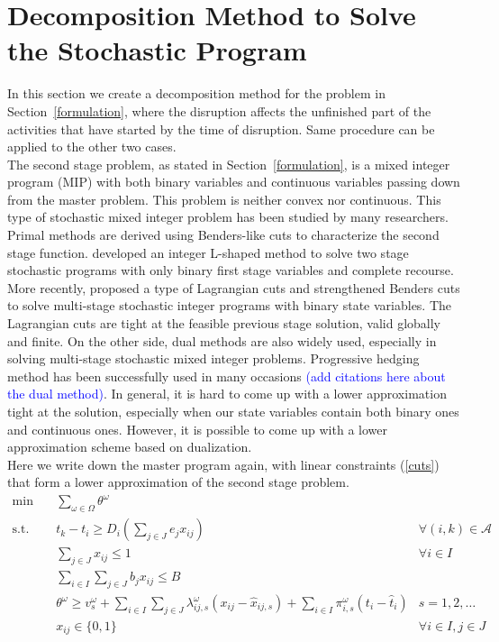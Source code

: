 \documentclass[11pt]{article}
\begin{document}
\section{Decomposition Method to Solve the Stochastic Program}
In this section we create a decomposition method for the problem in Section~\ref{formulation}, where the disruption affects the unfinished part of the activities that have started by the time of disruption. Same procedure can be applied to the other two cases.\\
\newline 
The second stage problem, as stated in Section~\ref{formulation}, is a mixed integer program (MIP) with both binary variables and continuous variables passing down from the master problem. This problem is neither convex nor continuous. This type of stochastic mixed integer problem has been studied by many researchers. Primal methods are derived using Benders-like cuts to characterize the second stage function. \cite{laporte1993integer} developed an integer L-shaped method to solve two stage stochastic programs with only binary first stage variables and complete recourse. More recently, \cite{zou2016nested} proposed a type of Lagrangian cuts and strengthened Benders cuts to solve multi-stage stochastic integer programs with binary state variables. The Lagrangian cuts are tight at the feasible previous stage solution, valid globally and finite. On the other side, dual methods are also widely used, especially in solving multi-stage stochastic mixed integer problems. Progressive hedging method has been successfully used in many occasions \textcolor{blue}{(add citations here about the dual method)}. In general, it is hard to come up with a lower approximation tight at the solution, especially when our state variables contain both binary ones and continuous ones. However, it is possible to come up with a lower approximation scheme based on dualization.\\
\newline 
Here we write down the master program again, with linear constraints (\ref{cuts}) that form a lower approximation of the second stage problem. 
	\begin{subequations}
		\begin{align}
			\min \quad & \sum_{\omega \in \Omega} \theta^\omega &\\
			\text{s.t.} \quad & t_k - t_i \geq D_i(\sum_{j \in J} e_jx_{ij}) & \forall (i,k) \in \mathcal{A}\\
			& \sum_{j \in J} x_{ij} \leq 1 & \forall i \in I\\
			& \sum_{i \in I}\sum_{j \in J} b_jx_{ij} \leq B &\\
			& \theta^{\omega} \geq v_{s}^\omega + \sum_{i \in I}\sum_{j \in J}\lambda_{ij,s}^\omega (x_{ij} - \hat{x}_{ij,s}) + \sum_{i \in I} \pi_{i,s}^\omega(t_i - \hat{t}_i)& s = 1,2,\dots \label{cuts}\\
			& x_{ij} \in \{0,1\} & \forall i \in I, j \in J
		\end{align}
		\label{master}
	\end{subequations}
\end{document}
